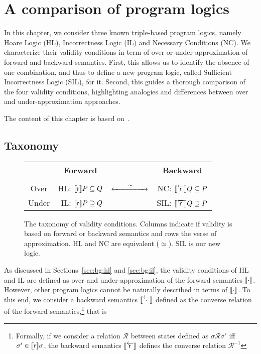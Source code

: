 
\chapter{A comparison of program logics}\label{ch:sil}
In this chapter, we consider three known triple-based program logics, namely Hoare Logic (HL), Incorrectness Logic (IL) and Necessary Conditions (NC). We characterize their validity conditions in term of over or under-approximation of forward and backward semantics. First, this allows us to identify the absence of one combination, and thus to define a new program logic, called Sufficient Incorrectness Logic (SIL), for it. Second, this guides a thorough comparison of the four validity conditions, highlighting analogies and differences between over and under-approximation approaches.

The content of this chapter is based on~\cite{ABGL24}.

\section{Taxonomy}
\begin{figure}[t]
	\centering

	\begin{tabular}{@{\quad}c@{\quad}|@{\quad}rcr@{\quad}}
		       & \multicolumn{1}{c}{Forward}             &                                        & \multicolumn{1}{c}{Backward}                                 \\[3pt]
		\hline &                                         &                                        &                                                              \\[-5pt]
		Over   & HL: \quad $\llbracket\mathsf{r}\rrbracket P \subseteq Q$ & $\xleftrightarrow{\qquad\simeq\qquad}$ & NC: \quad $\llbracket\overleftarrow{\mathsf{r}}\rrbracket Q \subseteq P$                       \\[5pt]
		Under  & IL: \quad $\llbracket\mathsf{r}\rrbracket P \supseteq Q$  &                                        & \textcolor{ACMBlue}{SIL: \quad $\llbracket\overleftarrow{\mathsf{r}}\rrbracket Q \supseteq P$}
	\end{tabular}
	\caption{The taxonomy of validity conditions. Columns indicate if validity is based on forward or backward semantics and rows the verse of approximation. HL and NC are equivalent ($\simeq$). SIL is our new logic.}
	\label{fig:sil:taxonomy}
\end{figure}

As discussed in Sections~\ref{sec:bg:hl} and \ref{sec:bg:il}, the validity conditions of HL and IL are defined as over and under-approximation of the forward semantics $\llbracket\cdot\rrbracket$. However, other program logics cannot be naturally described in terms of $\llbracket\cdot\rrbracket$. To this end, we consider a backward semantics $\llbracket\overleftarrow{\cdot}\rrbracket$ defined as the converse relation of the forward semantics,\footnote{Formally, if we consider a relation $\mathcal{R}$ between states defined as $\sigma \mathcal{R} \sigma'$ iff $\sigma' \in \llbracket\mathsf{r}\rrbracket \sigma$, the backward semantics $\llbracket\overleftarrow{\mathsf{r}}\rrbracket$ defines the converse relation $\mathcal{R}^{-1}$} that is

